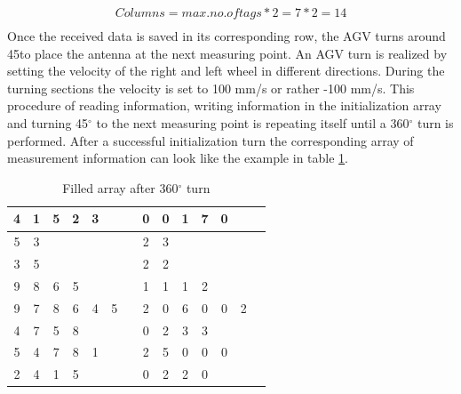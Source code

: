 \begin{align}
Columns = max. no. of  tags * 2 = 7 * 2 = 14\\
\end{align}
Once the received data is saved in its corresponding row, the AGV turns around 45\textdegree  to place the antenna at the next measuring point. An AGV turn is realized by setting the velocity of the right and left wheel in different directions. During the turning sections the velocity is set to 100 mm/s or rather -100 mm/s. 
This procedure of reading information, writing information in the initialization array and turning 45$^\circ$  to the next measuring point is repeating itself until a 360$^\circ$  turn is performed. After a successful initialization turn the corresponding array of measurement information can look like the example in table \ref{Init_Array}.
\begin{table}[!htbp]
\centering
\begin{tabular}{|c|c|c|c|c|c|c|c|c|c|c|c|c|c|}
\hline
4&1&5&2&3&&&0&0&1&7&0&&  \\ \hline
5&3&&&&&&2&3&&&&&  \\ \hline
3&5&&&&&&2&2&&&&&  \\ \hline
9&8&6&5&&&&1&1&1&2&&&  \\ \hline
9&7&8&6&4&5&&2&0&6&0&0&2&  \\ \hline
4&7&5&8&&&&0&2&3&3&&&  \\ \hline
5&4&7&8&1&&&2&5&0&0&0&&  \\ \hline
2&4&1&5&&&&0&2&2&0&&&  \\ \hline
\end{tabular}
\caption{Filled array after 360$^\circ$ turn}
\label{Init_Array}
\end{table}\\

